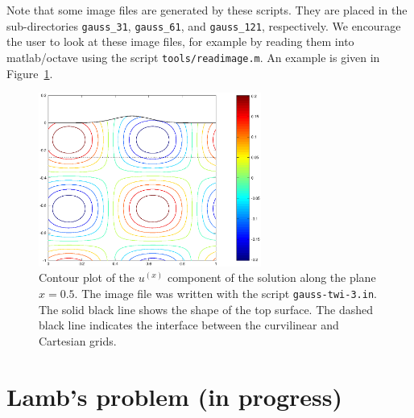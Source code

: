 \documentclass[11pt]{report}
\begin{document}
Note that some image files are generated by these scripts. They are placed in the sub-directories
\verb+gauss_31+, \verb+gauss_61+, and \verb+gauss_121+, respectively. We encourage
the user to look at these image files, for example by reading them into matlab/octave using the
script \verb+tools/readimage.m+. An example is given in Figure~\ref{fig:ux}.
\begin{figure}
\begin{center}
\includegraphics[width=0.65\textwidth]{ux.eps}
\caption{Contour plot of the $u^{(x)}$ component of the solution along the plane $x=0.5$. The image
  file was written with the script {\tt gauss-twi-3.in}. The solid black line shows the shape of the
  top surface. The dashed black line indicates the interface between the curvilinear and Cartesian
  grids.}
\label{fig:ux}
\end{center}
\end{figure}


\section{Lamb's problem (in progress)}\label{sec:lamb}
\end{document}
